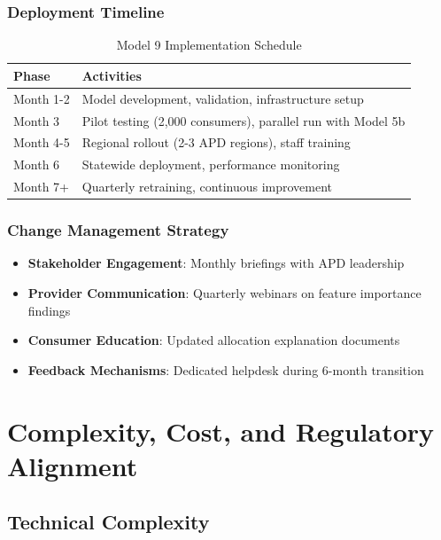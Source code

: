 \subsubsection{Deployment Timeline}

\begin{table}[h]
\centering
\caption{Model 9 Implementation Schedule}
\begin{tabular}{lp{10cm}}
\toprule
\textbf{Phase} & \textbf{Activities} \\
\midrule
Month 1-2 & Model development, validation, infrastructure setup \\
Month 3 & Pilot testing (2,000 consumers), parallel run with Model 5b \\
Month 4-5 & Regional rollout (2-3 APD regions), staff training \\
Month 6 & Statewide deployment, performance monitoring \\
Month 7+ & Quarterly retraining, continuous improvement \\
\bottomrule
\end{tabular}
\end{table}

\subsubsection{Change Management Strategy}

\begin{itemize}
    \item \textbf{Stakeholder Engagement}: Monthly briefings with APD leadership
    \item \textbf{Provider Communication}: Quarterly webinars on feature importance findings
    \item \textbf{Consumer Education}: Updated allocation explanation documents
    \item \textbf{Feedback Mechanisms}: Dedicated helpdesk during 6-month transition
\end{itemize}

\section{Complexity, Cost, and Regulatory Alignment}

\subsection{Technical Complexity}

